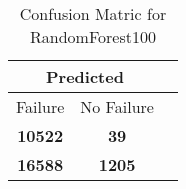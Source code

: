 \begin{table}[] 
\caption{Confusion Matric for RandomForest100} 
\label{Table: Prediction Accuracy-NoneRandomForest10095.0EKF-ignoresolarPanelDipole-solarPanelDipole} 
\centering 
\begin{tabular} 
 {@{}ccc@{}} 
\toprule 
\multicolumn{2}{c}{\textbf{Predicted}}
 \\ \midrule 
\multicolumn{1}{|c|}{Failure} & 
\multicolumn{1}{c|}{No Failure}
 \\ \midrule 
\multicolumn{1}{|c|}{\color{red}\textbf{10522}} & 
\multicolumn{1}{c|}{\color{red}\textbf{39}}
 \\ \midrule 
\multicolumn{1}{|c|}{\color{green}\textbf{16588}} & 
\multicolumn{1}{c|}{\color{green}\textbf{1205}}
 \\ \bottomrule 
\end{tabular} 
\end{table} 
